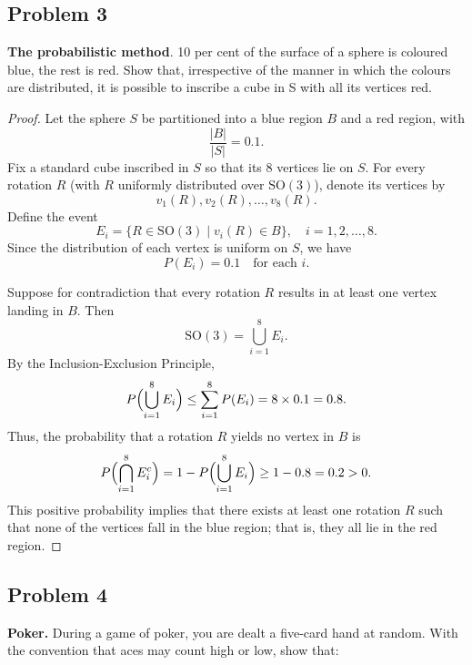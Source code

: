 \documentclass[letterpaper, 11pt]{article}
\newcommand{\1}{\mathds{1}}	%
\theoremstyle{definition}
\begin{document}
    \subsection*{Problem 3}
\textbf{The probabilistic method}. 10 per cent of the surface of a sphere is coloured blue, the rest is red.
Show that, irrespective of the manner in which the colours are distributed, it is possible to inscribe a cube in S with all its vertices red.
\begin{proof}
    Let the sphere \(S\) be partitioned into a blue region \(B\) and a red region, with 
    \[
    \frac{|B|}{|S|} = 0.1.
    \]
    Fix a standard cube inscribed in \(S\) so that its 8 vertices lie on \(S\). For every rotation \(R\) (with \(R\) uniformly distributed over \(\mathrm{SO}(3)\)), denote its vertices by 
    \[
    v_1(R), v_2(R), \dots, v_8(R).
    \]
    Define the event 
    \[
    E_i = \{ R \in \mathrm{SO}(3) \mid v_i(R) \in B \}, \quad i = 1,2,\dots,8.
    \]
    Since the distribution of each vertex is uniform on \(S\), we have
    \[
    P(E_i) = 0.1 \quad \text{for each } i.
    \]
    
    Suppose for contradiction that every rotation \(R\) results in at least one vertex landing in \(B\). Then
    \[
    \mathrm{SO}(3) = \bigcup_{i=1}^{8} E_i.
    \]
    By the Inclusion-Exclusion Principle,
    \[
    P\Bigl(\bigcup_{i=1}^{8} E_i\Bigr) 
    \le \sum_{i=1}^{8} P(E_i) 
    = 8\times 0.1 = 0.8.
    \]
    Thus, the probability that a rotation \(R\) yields no vertex in \(B\) is
    \[
    P\Bigl(\bigcap_{i=1}^{8} E_i^c\Bigr) = 1 - P\Bigl(\bigcup_{i=1}^{8} E_i\Bigr) \ge 1 - 0.8 = 0.2 > 0.
    \]
    This positive probability implies that there exists at least one rotation \(R\) such that none of the vertices fall in the blue region; that is, they all lie in the red region.
    
\end{proof}
\subsection*{Problem 4}
\textbf{Poker.} During a game of poker, you are dealt a five-card hand at random. With the convention that aces may count high or low, show that:
\end{document}
